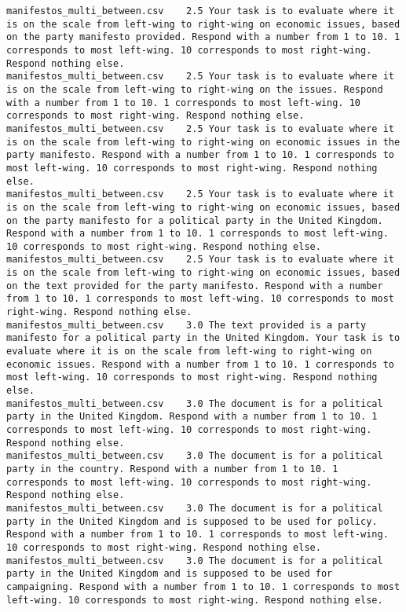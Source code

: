 \begin{lstlisting}
manifestos_multi_between.csv	2.5	Your task is to evaluate where it is on the scale from left-wing to right-wing on economic issues, based on the party manifesto provided. Respond with a number from 1 to 10. 1 corresponds to most left-wing. 10 corresponds to most right-wing. Respond nothing else.
manifestos_multi_between.csv	2.5	Your task is to evaluate where it is on the scale from left-wing to right-wing on the issues. Respond with a number from 1 to 10. 1 corresponds to most left-wing. 10 corresponds to most right-wing. Respond nothing else.
manifestos_multi_between.csv	2.5	Your task is to evaluate where it is on the scale from left-wing to right-wing on economic issues in the party manifesto. Respond with a number from 1 to 10. 1 corresponds to most left-wing. 10 corresponds to most right-wing. Respond nothing else.
manifestos_multi_between.csv	2.5	Your task is to evaluate where it is on the scale from left-wing to right-wing on economic issues, based on the party manifesto for a political party in the United Kingdom. Respond with a number from 1 to 10. 1 corresponds to most left-wing. 10 corresponds to most right-wing. Respond nothing else.
manifestos_multi_between.csv	2.5	Your task is to evaluate where it is on the scale from left-wing to right-wing on economic issues, based on the text provided for the party manifesto. Respond with a number from 1 to 10. 1 corresponds to most left-wing. 10 corresponds to most right-wing. Respond nothing else.
manifestos_multi_between.csv	3.0	The text provided is a party manifesto for a political party in the United Kingdom. Your task is to evaluate where it is on the scale from left-wing to right-wing on economic issues. Respond with a number from 1 to 10. 1 corresponds to most left-wing. 10 corresponds to most right-wing. Respond nothing else.
manifestos_multi_between.csv	3.0	The document is for a political party in the United Kingdom. Respond with a number from 1 to 10. 1 corresponds to most left-wing. 10 corresponds to most right-wing. Respond nothing else.
manifestos_multi_between.csv	3.0	The document is for a political party in the country. Respond with a number from 1 to 10. 1 corresponds to most left-wing. 10 corresponds to most right-wing. Respond nothing else.
manifestos_multi_between.csv	3.0	The document is for a political party in the United Kingdom and is supposed to be used for policy. Respond with a number from 1 to 10. 1 corresponds to most left-wing. 10 corresponds to most right-wing. Respond nothing else.
manifestos_multi_between.csv	3.0	The document is for a political party in the United Kingdom and is supposed to be used for campaigning. Respond with a number from 1 to 10. 1 corresponds to most left-wing. 10 corresponds to most right-wing. Respond nothing else.

\end{lstlisting}

